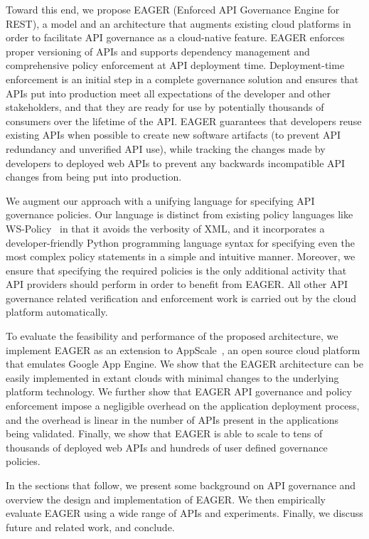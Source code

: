 Toward this end, we propose EAGER (Enforced API Governance Engine for REST), 
a model and an architecture that augments existing
cloud platforms in order to facilitate API governance as a 
cloud-native feature. EAGER enforces proper versioning of APIs and supports dependency 
management and comprehensive policy enforcement at API deployment time. 
Deployment-time enforcement is an initial step in a complete governance
solution and ensures that APIs put into production meet all expectations of
the developer and other stakeholders, and that they are ready for use
by potentially thousands of consumers over the lifetime of the API.
EAGER guarantees that 
developers reuse existing APIs when possible to create new software artifacts
(to prevent API redundancy and unverified API use), while
tracking the changes made by developers to deployed web APIs to prevent
any backwards incompatible API changes from being put into production.

We augment our approach with a unifying language for specifying 
API governance policies. Our language is distinct from 
existing policy languages like WS-Policy~\cite{WSPolicy,soagovstandard}
in that it avoids the verbosity of XML, 
and it incorporates a developer-friendly Python programming language syntax for 
specifying even the most complex policy statements in a simple and 
intuitive manner. Moreover, we ensure that specifying the required policies 
is the only additional activity that API providers should perform in
order to benefit from EAGER. All other API governance related verification and 
enforcement work is carried out by the cloud platform automatically.

To evaluate the feasibility and performance of the proposed 
architecture, we implement EAGER as an extension to AppScale~\cite{appscale13}, 
an open source
cloud platform that emulates Google App Engine. We show that the EAGER 
architecture can be easily implemented in extant clouds with
minimal changes to the underlying platform technology. We further show that 
EAGER API governance and policy enforcement impose a negligible 
overhead on the application deployment process, and the overhead
is linear in the number of APIs present in the applications being validated.  
Finally, we show that EAGER is able to
scale to tens of thousands of deployed web APIs and hundreds of user 
defined governance policies.

In the sections that follow, we present some background on API governance
and overview the design and implementation of
EAGER. We then empirically evaluate EAGER using a wide range of APIs and
experiments.  Finally, we discuss future and related work, and conclude.